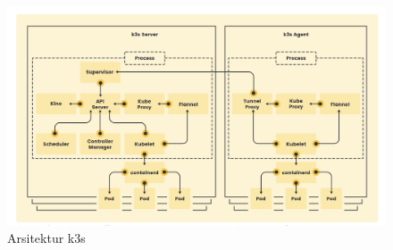 \begin{figure}[h]
  \centering
  \includegraphics[width=1\textwidth]{resources/chapter-2/arsitektur-k3s.jpg}
  \caption{Arsitektur k3s \parencite{k3s}}
  \label{fig:arsitektur-k3s}
\end{figure}
